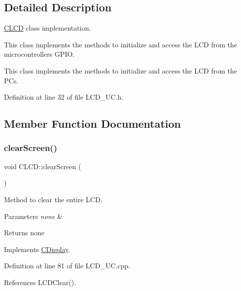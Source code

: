 \subsection{Detailed Description}
\mbox{\hyperlink{class_c_l_c_d}{C\+L\+CD}} class implementation. 

This class implements the methods to initialize and access the L\+CD from the microcontroller\textquotesingle{}s G\+P\+IO.

This class implements the methods to initialize and access the L\+CD from the PC\textquotesingle{}s. 

Definition at line 32 of file L\+C\+D\+\_\+\+U\+C.\+h.



\subsection{Member Function Documentation}
\mbox{\label{class_c_l_c_d_aef53edad0951495613b38a0033a7d34c}} 
\subsubsection{\texorpdfstring{clear\+Screen()}{clearScreen()}}
{\footnotesize\ttfamily void C\+L\+C\+D\+::clear\+Screen (\begin{DoxyParamCaption}{ }\end{DoxyParamCaption})\hspace{0.3cm}{\ttfamily [virtual]}}



Method to clear the entire L\+CD. 


\begin{DoxyParams}{Parameters}
{\em none} & \\
\hline
\end{DoxyParams}
\begin{DoxyReturn}{Returns}
none 
\end{DoxyReturn}


Implements \mbox{\hyperlink{class_c_display}{C\+Display}}.



Definition at line 81 of file L\+C\+D\+\_\+\+U\+C.\+cpp.



References L\+C\+D\+Clear().

\mbox{\label{class_c_l_c_d_af2d845b403b8978261a397cfe50f2fdc}} 

